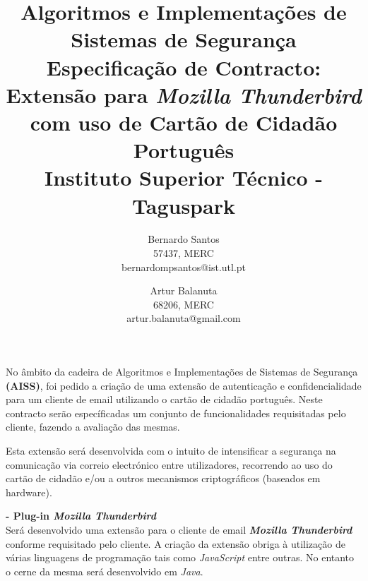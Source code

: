 \documentclass[times, 10pt,twocolumn]{article}
\begin{document}
\title{Algoritmos e Implementa\c{c}\~oes de Sistemas de Seguran\c{c}a\\
Especifica\c{c}\~ao de Contracto: \\
Extens\~ao para \emph{Mozilla Thunderbird} com uso de Cart\~ao de Cidad\~ao Portugu\^es 
\\ Instituto Superior T\'ecnico - Taguspark}

\author{Bernardo Santos\\ 57437, MERC \\  bernardompsantos@ist.utl.pt\\
\and
Artur Balanuta\\
68206, MERC\\
artur.balanuta@gmail.com\\
}

\maketitle
\thispagestyle{empty}

No \^ambito da cadeira de Algoritmos e Implementa\c{c}\~oes de Sistemas de Seguran\c{c}a \textbf{(AISS)}, foi pedido a cria\c{c}\~ao de uma extens\~ao de autentica\c{c}\~ao e confidencialidade para um cliente de email utilizando o cart\~ao de cidad\~ao portugu\^es. Neste contracto ser\~ao espec\'ificadas um conjunto de funcionalidades requisitadas pelo cliente, fazendo a avalia\c{c}\~ao das mesmas.

Esta extens\~ao ser\'a desenvolvida com o intuito de intensificar a seguran\c{c}a na comunica\c{c}\~ao via correio electr\'onico entre utilizadores, recorrendo ao uso do cart\~ao de cidad\~ao e/ou a outros mecanismos criptogr\'aficos (baseados em hardware).



\noindent \textbf{- Plug-in \emph{Mozilla Thunderbird}}\\
\indent Ser\'a desenvolvido uma extens\~ao para o cliente de email \textbf{\emph{Mozilla Thunderbird}} conforme requisitado pelo cliente. A cria\c{c}\~ao da extens\~ao obriga \`a utiliza\c{c}\~ao de v\'arias linguagens de programa\c{c}\~ao tais como \emph{JavaScript} entre outras. No entanto o cerne da mesma ser\'a desenvolvido em \emph{Java}. \\
\end{document}
